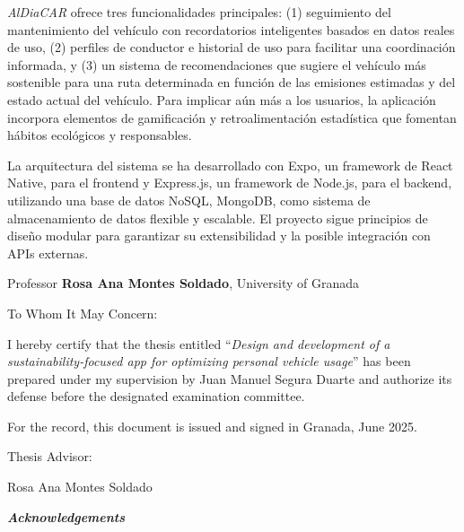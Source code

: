 \textgap

\textit{AlDiaCAR} ofrece tres funcionalidades principales: (1) seguimiento del mantenimiento del vehículo con recordatorios inteligentes basados en datos reales de uso, (2) perfiles de conductor e historial de uso para facilitar una coordinación informada, y (3) un sistema de recomendaciones que sugiere el vehículo más sostenible para una ruta determinada en función de las emisiones estimadas y del estado actual del vehículo. Para implicar aún más a los usuarios, la aplicación incorpora elementos de gamificación y retroalimentación estadística que fomentan hábitos ecológicos y responsables.

\textgap

La arquitectura del sistema se ha desarrollado con Expo, un framework de React Native, para el frontend y Express.js, un framework de Node.js, para el backend, utilizando una base de datos NoSQL, MongoDB, como sistema de almacenamiento de datos flexible y escalable. El proyecto sigue principios de diseño modular para garantizar su extensibilidad y la posible integración con APIs externas.

\textgap

\clearpage
\mbox{}
\newpage


\begin{flushleft}
    Professor \textbf{Rosa Ana Montes Soldado}, University of Granada
\end{flushleft}


\textgap

To Whom It May Concern:

\textgap

I hereby certify that the thesis entitled ``\textit{Design and development of a sustainability-focused app for optimizing personal vehicle usage}'' has been prepared under my supervision by Juan Manuel Segura Duarte and authorize its defense before the designated examination committee.

\textgap

For the record, this document is issued and signed in Granada, June 2025.

\vspace{1cm}

Thesis Advisor:

\vspace{5cm}

\noindent Rosa Ana Montes Soldado


\clearpage
\mbox{}
\newpage


\begin{center}
    \large\bfseries \textit{Acknowledgements}
\end{center}

